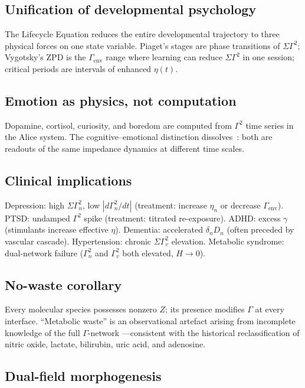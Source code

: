 \documentclass[aps,pre,twocolumn,superscriptaddress,floatfix]{revtex4-2}
\begin{document}
\subsection{Unification of developmental psychology}

The Lifecycle Equation reduces the entire developmental
trajectory to three physical forces on one state variable.
Piaget's stages are phase transitions of $\Sigma\Gamma^2$;
Vygotsky's ZPD is the $\Gamma_{\mathrm{env}}$ range where
learning can reduce $\Sigma\Gamma^2$ in one session;
critical periods are intervals of enhanced $\eta(t)$.

\subsection{Emotion as physics, not computation}

Dopamine, cortisol, curiosity, and boredom are computed
from $\Gamma^2$ time series in the Alice system.
The cognitive--emotional distinction
dissolves~\cite{Damasio1994}: both are readouts of the
same impedance dynamics at different time scales.

\subsection{Clinical implications}

Depression: high $\Sigma\Gamma_n^2$, low $|d\Gamma_n^2/dt|$
(treatment: increase $\eta_n$ or decrease $\Gamma_{\mathrm{env}}$).
PTSD: undamped $\Gamma^2$ spike (treatment: titrated re-exposure).
ADHD: excess $\gamma$ (stimulants increase effective $\eta$).
Dementia: accelerated $\delta_n D_n$ (often preceded by
vascular cascade).
Hypertension: chronic $\Sigma\Gamma_v^2$ elevation.
Metabolic syndrome: dual-network failure ($\Gamma_n^2$ and
$\Gamma_v^2$ both elevated, $H \to 0$).

\subsection{No-waste corollary}

Every molecular species possesses nonzero $Z$; its presence
modifies $\Gamma$ at every interface.
``Metabolic waste'' is an observational artefact arising
from incomplete knowledge of the full $\Gamma$-network
---consistent with the historical reclassification of
nitric oxide, lactate, bilirubin, uric acid, and adenosine.

\subsection{Dual-field morphogenesis}
\end{document}
